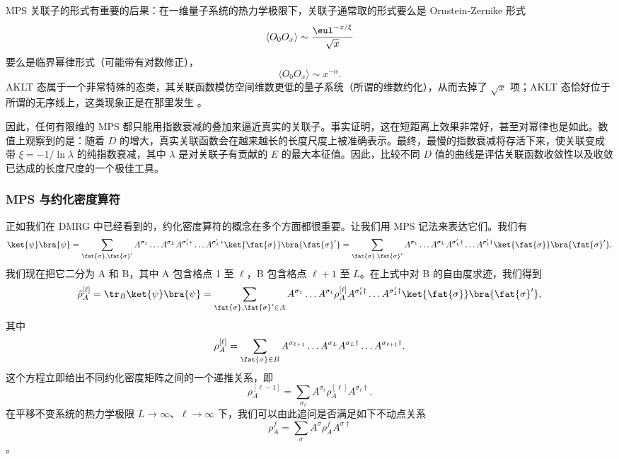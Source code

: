 MPS 关联子的形式有重要的后果：在一维量子系统的热力学极限下，关联子通常取的形式要么是 Ornstein-Zernike 形式
\begin{equation}
\langle O_0 O_x \rangle \sim \frac{\eul^{-x/\xi}}{\sqrt{x}}
\end{equation}
要么是临界幂律形式（可能带有对数修正），
\begin{equation}
\langle O_0 O_x \rangle \sim x^{-\alpha} .
\end{equation}
AKLT 态属于一个非常特殊的态类，其关联函数模仿空间维数更低的量子系统（所谓的维数约化），从而去掉了 $\sqrt{x}$ 项；AKLT 态恰好位于所谓的无序线上，这类现象正是在那里发生 \cite{Garel96}。

因此，任何有限维的 MPS 都只能用指数衰减的叠加来逼近真实的关联子。事实证明，这在短距离上效果非常好，甚至对幂律也是如此。数值上观察到的是：随着 $D$ 的增大，真实关联函数会在越来越长的长度尺度上被准确表示。最终，最慢的指数衰减将存活下来，使关联变成带 $\xi =  -1/\ln \lambda$ 的纯指数衰减，其中 $\lambda$ 是对关联子有贡献的 $E$ 的最大本征值。因此，比较不同 $D$ 值的曲线是评估关联函数收敛性以及收敛已达成的长度尺度的一个极佳工具。

\subsubsection{MPS 与约化密度算符}
正如我们在 DMRG 中已经看到的，约化密度算符的概念在多个方面都很重要。让我们用 MPS 记法来表达它们。我们有
\begin{equation}
\ket{\psi}\bra{\psi} = \sum_{\fat{\sigma},\fat{\sigma}'} A^{\sigma_1} \ldots A^{\sigma_L} A^{\sigma'_1*} \ldots A^{\sigma'_L*} \ket{\fat{\sigma}} \bra{\fat{\sigma}'} =
\sum_{\fat{\sigma},\fat{\sigma}'} A^{\sigma_1} \ldots A^{\sigma_L} A^{\sigma'_L\dagger} \ldots A^{\sigma'_1\dagger} \ket{\fat{\sigma}} \bra{\fat{\sigma}'} .
\label{eq:fullstateprojector}
\end{equation}
我们现在把它二分为 A 和 B，其中 A 包含格点 1 至 $\ell$，B 包含格点 $\ell+1$ 至 $L$。在上式中对 B 的自由度求迹，我们得到
\begin{equation}
\hat{\rho}_A^{[\ell]} = \tr_B \ket{\psi}\bra{\psi} = \sum_{\fat{\sigma},\fat{\sigma}'\in A}
A^{\sigma_1} \ldots A^{\sigma_\ell} \rho_A^{[\ell]} A^{\sigma'_\ell\dagger} \ldots A^{\sigma'_1\dagger} \ket{\fat{\sigma}} \bra{\fat{\sigma}'} ,
\end{equation}
其中
\begin{equation}
\rho_A^{[\ell]} =  \sum_{\fat{\sigma}\in B} A^{\sigma_{\ell+1}} \ldots A^{\sigma_L} A^{\sigma_L\dagger} \ldots A^{\sigma_{\ell+1}\dagger} .
\end{equation}
这个方程立即给出不同约化密度矩阵之间的一个递推关系，即
\begin{equation}
\rho_A^{[\ell-1]} = \sum_{\sigma_\ell} A^{\sigma_\ell} \rho_A^{[\ell]} A^{\sigma_\ell\dagger} .
\label{eq:rhoarecursion}
\end{equation}
在平移不变系统的热力学极限 $L\rightarrow\infty$、$\ell\rightarrow\infty$ 下，我们可以由此追问是否满足如下不动点关系
\begin{equation}
\rho_A^f = \sum_{\sigma} A^{\sigma} \rho_A^{f} A^{\sigma\dagger}
\end{equation}
。

